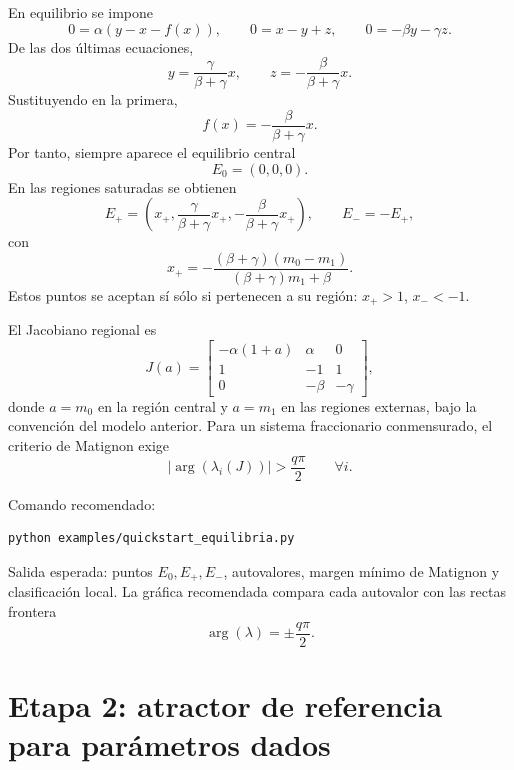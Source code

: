 \documentclass[11pt]{article}
\begin{document}
En equilibrio se impone
\[
0=\alpha(y-x-f(x)),\qquad 0=x-y+z,
\qquad 0=-\beta y-\gamma z.
\]
De las dos últimas ecuaciones,
\begin{equation}
 y=\frac{\gamma}{\beta+\gamma}x,
\qquad
 z=-\frac{\beta}{\beta+\gamma}x.
\end{equation}
Sustituyendo en la primera,
\begin{equation}
 f(x)=-\frac{\beta}{\beta+\gamma}x.
\end{equation}
Por tanto, siempre aparece el equilibrio central
\begin{equation}
E_0=(0,0,0).
\end{equation}
En las regiones saturadas se obtienen
\begin{equation}
E_+=\left(x_+,\frac{\gamma}{\beta+\gamma}x_+,-\frac{\beta}{\beta+\gamma}x_+\right),
\qquad
E_-=-E_+,
\end{equation}
con
\begin{equation}
 x_+=-\frac{(\beta+\gamma)(m_0-m_1)}{(\beta+\gamma)m_1+\beta}.
\end{equation}
Estos puntos se aceptan sí sólo si pertenecen a su región: \(x_+>1\), \(x_-<-1\).

El Jacobiano regional es
\begin{equation}
J(a)=
\begin{bmatrix}
-\alpha(1+a)&\alpha&0\\
1&-1&1\\
0&-\beta&-\gamma
\end{bmatrix},
\end{equation}
donde \(a=m_0\) en la región central y \(a=m_1\) en las regiones externas, bajo la convención del modelo anterior. Para un sistema fraccionario conmensurado, el criterio de Matignon exige
\begin{equation}
 |\arg(\lambda_i(J))|>\frac{q\pi}{2}
 \qquad \forall i.
\end{equation}

Comando recomendado:
\begin{lstlisting}
python examples/quickstart_equilibria.py
\end{lstlisting}

Salida esperada: puntos \(E_0,E_+,E_-\), autovalores, margen mínimo de Matignon y clasificación local. La gráfica recomendada compara cada autovalor con las rectas frontera
\begin{equation}
 \arg(\lambda)=\pm\frac{q\pi}{2}.
\end{equation}

\section{Etapa 2: atractor de referencia para parámetros dados}
\end{document}
